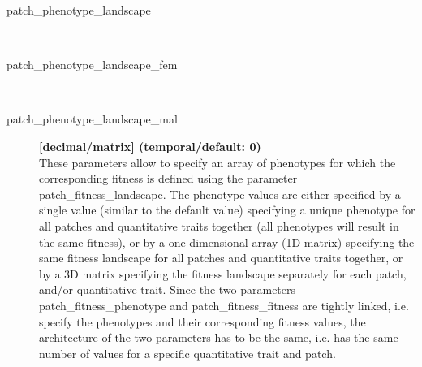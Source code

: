 \documentclass[letterpaper,12pt,oneside]{book}
\begin{document}
\begin{description}
\item[patch\_phenotype\_landscape]\hspace*{\fill}\\
\vspace{-9mm}
\item[patch\_phenotype\_landscape\_fem]\hspace*{\fill}\\
\vspace{-9mm}
\item[patch\_phenotype\_landscape\_mal]\textbf{[decimal/matrix] (temporal/default: 0)}\\
These parameters allow to specify an array of phenotypes for which the corresponding fitness is defined using the parameter \textsf{patch\_fitness\_landscape}.  The phenotype values are either specified by a single value (similar to the default value) specifying a unique phenotype for all patches and quantitative traits together (all phenotypes will result in the same fitness), or by a one dimensional array (1D matrix) specifying the same fitness landscape for all patches and quantitative traits together, or by a 3D matrix specifying the fitness landscape separately for each patch, and/or quantitative trait. Since the two parameters \textsf{patch\_fitness\_phenotype} and \textsf{patch\_fitness\_fitness} are tightly linked, i.e. specify the phenotypes and their corresponding fitness values, the architecture of the two parameters has to be the same, i.e. has the same number of values for a specific quantitative trait and patch. 



\end{description}
\end{document}

